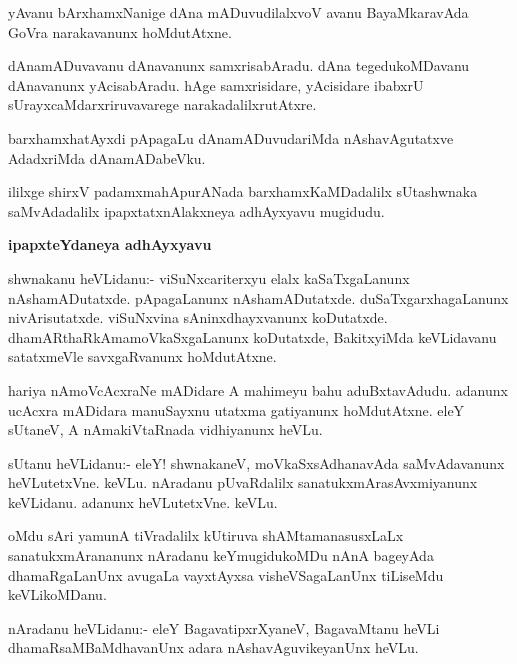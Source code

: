\begin{mng}
yAvanu bArxhamxNanige dAna mADuvudilalxvoV avanu BayaMkaravAda GoVra narakavanunx hoMdutAtxne.
\end{mng}

\begin{mng}
dAnamADuvavanu dAnavanunx samxrisabAradu. dAna tegedukoMDavanu dAnavanunx yAcisabAradu. hAge samxrisidare, yAcisidare ibabxrU sUrayxcaMdarxriruvavarege narakadalilxrutAtxre.
\end{mng}

\begin{mng}
barxhamxhatAyxdi pApagaLu dAnamADuvudariMda nAshavAgutatxve AdadxriMda dAnamADabeVku.
\end{mng}
ililxge shirxV padamxmahApurANada barxhamxKaMDadalilx sUtashwnaka saMvAdadalilx ipapxtatxnAlakxneya adhAyxyavu mugidudu.

\begin{center}
\textbf{\large ipapxteYdaneya adhAyxyavu}
\end{center}

\begin{mng}
shwnakanu heVLidanu:- viSuNxcariterxyu elalx kaSaTxgaLanunx nAshamADutatxde. pApagaLanunx nAshamADutatxde. duSaTxgarxhagaLanunx nivArisutatxde. viSuNxvina sAninxdhayxvanunx koDutatxde. dhamARthaRkAmamoVkaSxgaLanunx koDutatxde, BakitxyiMda keVLidavanu satatxmeVle savxgaRvanunx hoMdutAtxne.
\end{mng}

\begin{mng}
hariya nAmoVcAcxraNe mADidare A mahimeyu bahu aduBxtavAdudu. adanunx ucAcxra mADidara manuSayxnu utatxma gatiyanunx hoMdutAtxne. eleY sUtaneV, A nAmakiVtaRnada vidhiyanunx heVLu.
\end{mng}

\begin{mng}
sUtanu heVLidanu:- eleY! shwnakaneV, moVkaSxsAdhanavAda saMvAdavanunx heVLutetxVne. keVLu. nAradanu pUvaRdalilx sanatukxmArasAvxmiyanunx keVLidanu. adanunx heVLutetxVne. keVLu.
\end{mng}

\begin{mng}
oMdu sAri yamunA tiVradalilx kUtiruva shAMtamanasusxLaLx sanatukxmArananunx nAradanu keYmugidukoMDu nAnA bageyAda dhamaRgaLanUnx avugaLa vayxtAyxsa visheVSagaLanUnx tiLiseMdu keVLikoMDanu.
\end{mng}

\begin{mng}
nAradanu heVLidanu:- eleY BagavatipxrXyaneV, BagavaMtanu heVLi dhamaRsaMBaMdhavanUnx adara nAshavAguvikeyanUnx heVLu.
\end{mng}

